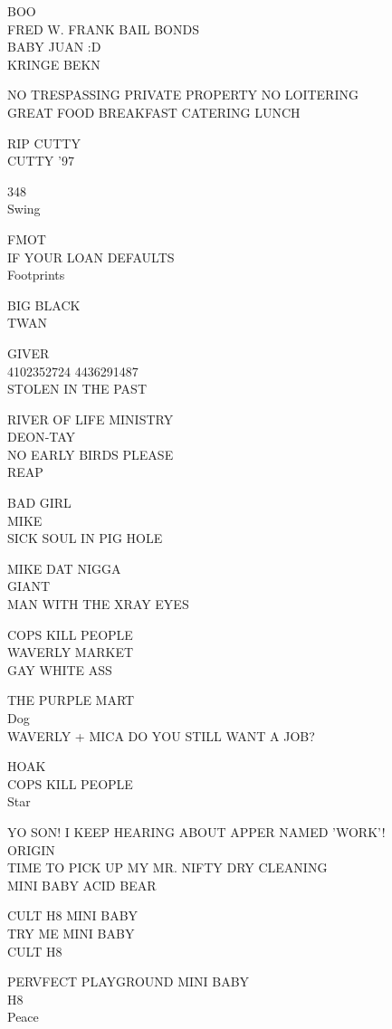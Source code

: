 \documentclass[10pt,letterpaper]{article}
\begin{document}
BOO\\
FRED W. FRANK BAIL BONDS\\
BABY JUAN :D\\
KRINGE BEKN

NO TRESPASSING PRIVATE PROPERTY NO LOITERING\\
GREAT FOOD BREAKFAST CATERING LUNCH

RIP CUTTY\\
CUTTY '97

348\\
Swing

FMOT\\
IF YOUR LOAN DEFAULTS\\
Footprints

BIG BLACK\\
TWAN

GIVER\\
4102352724 4436291487\\
STOLEN IN THE PAST

RIVER OF LIFE MINISTRY\\
DEON{-}TAY\\
NO EARLY BIRDS PLEASE\\
REAP

BAD GIRL\\
MIKE\\
SICK SOUL IN PIG HOLE

MIKE DAT NIGGA\\
GIANT\\
MAN WITH THE XRAY EYES

COPS KILL PEOPLE\\
WAVERLY MARKET\\
GAY WHITE ASS

THE PURPLE MART\\
Dog\\
WAVERLY + MICA DO YOU STILL WANT A JOB?

HOAK\\
COPS KILL PEOPLE\\
Star

YO SON!  I KEEP HEARING ABOUT APPER NAMED 'WORK'!\\
ORIGIN\\
TIME TO PICK UP MY MR. NIFTY DRY CLEANING\\
MINI BABY ACID BEAR

CULT H8 MINI BABY\\
TRY ME MINI BABY\\
CULT H8

PERVFECT PLAYGROUND MINI BABY\\
H8\\
Peace
\end{document}
